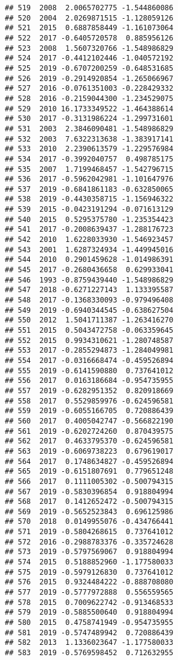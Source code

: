 \documentclass[
]{article}
\begin{document}
\begin{verbatim}
## 519  2008  2.0065702775 -1.544860086
## 520  2004  2.0269871515 -1.128059126
## 521  2015  0.6887858449 -1.161073064
## 522  2017 -0.6405720578  0.885956126
## 523  2008  1.5607320766 -1.548986829
## 524  2017 -0.4412102446 -1.040572192
## 525  2019 -0.6707200259 -0.648531685
## 526  2019 -0.2914920854 -1.265066967
## 527  2016 -0.0761351003 -0.228429332
## 528  2016 -0.2159044300 -1.234529075
## 529  2010 16.1733349522 -1.464388614
## 530  2017 -0.3131986224 -1.299731601
## 531  2003  2.3846090481 -1.548986829
## 532  2003  7.6322313638 -1.383917141
## 533  2010  2.2390613579 -1.229576984
## 534  2017 -0.3992040757  0.498785175
## 535  2007  1.7199468457 -1.542796715
## 536  2017 -0.5962042981 -1.101647976
## 537  2019 -0.6841861183 -0.632850065
## 538  2019 -0.4430358715 -1.156946322
## 539  2015 -0.0423191294 -0.071613129
## 540  2015  0.5295375780 -1.235354423
## 541  2017 -0.2008639437 -1.288176723
## 542  2010  1.6228033930 -1.546923457
## 543  2001  1.6287324934 -1.449945016
## 544  2010  0.2901459628 -1.014986391
## 545  2017 -0.2680436658  0.629933041
## 546  1993 -0.8759439440 -1.548986829
## 547  2018 -0.6271227143  1.133395587
## 548  2017 -0.1368330093 -0.979496408
## 549  2019 -0.6940344545 -0.638627504
## 550  2012  1.5041711387 -1.263416270
## 551  2015  0.5043472758 -0.063359645
## 552  2015  0.9934310621 -1.280748587
## 553  2017 -0.2855294873 -1.284049981
## 554  2017 -0.0316668474 -0.459526894
## 555  2019 -0.6141590880  0.737641012
## 556  2017  0.0163186684 -0.954735955
## 557  2019 -0.6282951352  0.820918669
## 558  2017  0.5529859976 -0.624596581
## 559  2019 -0.6055166705  0.720886439
## 560  2017  0.4005042747 -0.566822190
## 561  2019 -0.6202724260  0.870439575
## 562  2017  0.4633795370 -0.624596581
## 563  2019 -0.6069738223  0.679619017
## 564  2017  0.1748634827 -0.459526894
## 565  2019 -0.6151807691  0.779651248
## 566  2017  0.1111005302 -0.500794315
## 567  2019 -0.5830396854  0.918804994
## 568  2017  0.1412652472 -0.500794315
## 569  2019 -0.5652523843  0.696125986
## 570  2018  0.0149955076 -0.434766441
## 571  2019 -0.5804268615  0.737641012
## 572  2016 -0.2988783376 -0.335724628
## 573  2019 -0.5797569067  0.918804994
## 574  2015  0.5188852960 -1.177580033
## 575  2019 -0.5979126830  0.737641012
## 576  2015  0.9324484222 -0.888708080
## 577  2019 -0.5777972888  0.556559565
## 578  2015  0.7009622742 -0.913468533
## 579  2019 -0.5885500640  0.918804994
## 580  2015  0.4758741949 -0.954735955
## 581  2019 -0.5747489942  0.720886439
## 582  2013  1.1336023647 -1.177580033
## 583  2019 -0.5769598452  0.712632955

\end{verbatim}
\end{document}
